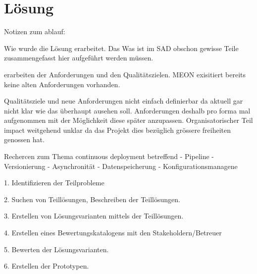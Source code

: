 \chapter{Lösung}

Notizen zum ablauf:

Wie wurde die Lösung erarbeitet. Das Was ist im SAD obschon gewisse Teile zusammengefasst hier aufgeführt werden müssen.

erarbeiten der Anforderungen und den Qualitätszielen. MEON exisitiert bereits keine alten Anforderungen vorhanden. 

Qualitätsziele und neue Anforderungen nicht einfach definierbar da aktuell gar nicht klar wie das überhaupt ausehen soll. Anforderungen deshalb pro forma mal aufgenommen mit der Möglichkeit diese später anzupassen.
Organisatorischer Teil impact weitgehend unklar da das Projekt dies bezüglich grössere freiheiten genossen hat. 

Rechercen zum Thema continuous deployment betreffend
- Pipeline
- Versionierung
- Asynchronität
- Datenspeicherung
- Konfigurationsmanagene

1. Identifizieren der Teilprobleme

2. Suchen von Teillösungen, Beschreiben der Teillösungen.

3. Erstellen von Lösungsvarianten mittels der Teillösungen.

4. Erstellen eines Bewertungskatalogens mit den Stakeholdern/Betreuer

5. Bewerten der Lösungsvarianten.

6. Erstellen der Prototypen.